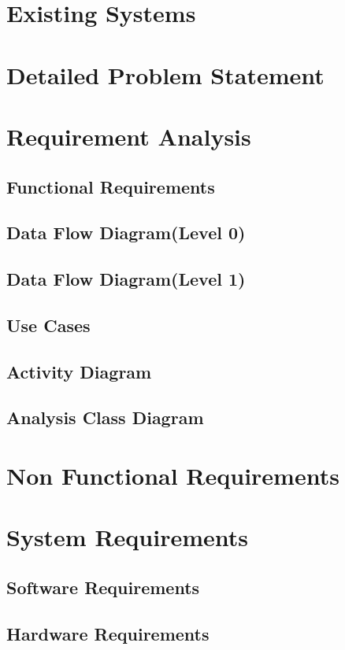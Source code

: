 \section{Existing Systems}
\section{Detailed Problem Statement}
\section{Requirement Analysis}


    \subsection{Functional Requirements}
    \subsection{Data Flow Diagram(Level 0)}
    \subsection{Data Flow Diagram(Level 1)}
    
    \subsection{Use Cases}
    \subsection{Activity Diagram}
    \subsection{Analysis Class Diagram}

\section{Non Functional Requirements}
\section{System Requirements}
    \subsection{Software Requirements}
    \subsection{Hardware Requirements}